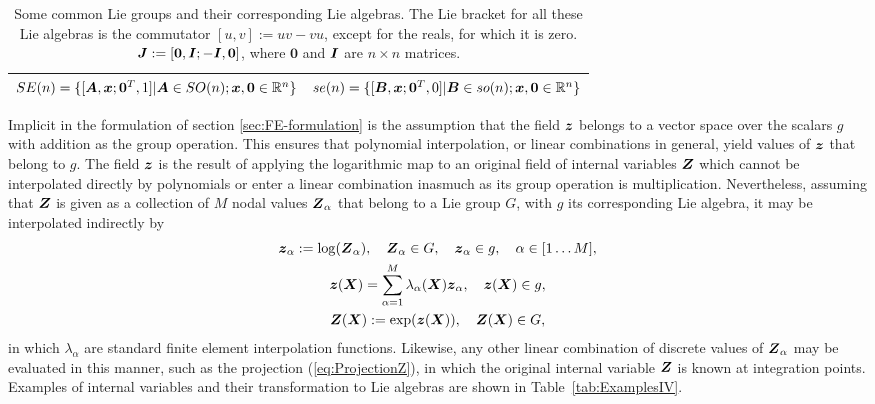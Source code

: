 \documentclass[12pt]{article}
\newcommand{\mbs}[1]{\boldsymbol{#1}}
\newcommand{\mbb}[1]{\mathbb{#1}}
\def\bA{{\mbs{A}}} \def\bB{{\mbs{B}}} \def\bC{{\mbs{C}}}
\def\bJ{{\mbs{J}}} \def\bK{{\mbs{K}}} \def\bL{{\mbs{L}}}
\begin{document}
\begin{table}[htbp]
\begin{center}
\begin{tabular}{ l l }
      \\
      $SE(n)=\{[\bA, \bx; \mathbf{0}^T, 1] | \bA \in SO(n); \bx,
      \mathbf{0} \in \mbb{R}^n\}$
      &
      $se(n)=\{[\bB, \bx; \mathbf{0}^T, 0] | \bB \in so(n); \bx,
      \mathbf{0} \in \mbb{R}^n\}$
      \\
      \bottomrule
    \end{tabular}
    \caption{Some common Lie groups and their corresponding Lie
      algebras. The Lie bracket for all these Lie algebras is the
      commutator $[u,v] := uv - vu$, except for the reals, for which
      it is zero. $\bJ := [\mathbf{0}, \bI; -\bI, \mathbf{0}]$, where
      $\mathbf{0}$ and $\bI$ are $n \times n$ matrices.}
    \label{tab:LieGroupsLieAlgebras}
  \end{center}
\end{table}

Implicit in the formulation of section \ref{sec:FE-formulation} is the
assumption that the field $\bz$ belongs to a vector space over the
scalars $g$ with addition as the group operation.  This ensures that
polynomial interpolation, or linear combinations in general, yield
values of $\bz$ that belong to $g$. The field $\bz$ is the result of
applying the logarithmic map to an original field of internal
variables $\bZ$ which cannot be interpolated directly by polynomials
or enter a linear combination inasmuch as its group operation is
multiplication.  Nevertheless, assuming that $\bZ$ is given as a
collection of $M$ nodal values $\bZ_\alpha$ that belong to a Lie group
$G$, with $g$ its corresponding Lie algebra, it may be interpolated
indirectly by
\begin{gather} \label{eq:InterpolationBegin}
  \bz_\alpha := \log(\bZ_\alpha),
  \quad \bZ_\alpha \in G,
  \quad \bz_\alpha \in g,
  \quad \alpha \in [1 \ldots M],
  \\
  \bz(\bX) = \sum_{\alpha=1}^M \lambda_\alpha(\bX) \bz_\alpha,
  \quad \bz(\bX) \in g,
  \\
  \bZ(\bX) := \exp(\bz(\bX)),
  \quad \bZ(\bX) \in G, \label{eq:InterpolationEnd}
\end{gather}
in which $\lambda_\alpha$ are standard finite element interpolation
functions.  Likewise, any other linear combination of discrete values
of $\bZ_\alpha$ may be evaluated in this manner, such as the
projection (\ref{eq:ProjectionZ}), in which the original internal
variable $\bZ$ is known at integration points. Examples of internal
variables and their transformation to Lie algebras are shown in
Table~\ref{tab:ExamplesIV}.
\end{document}
